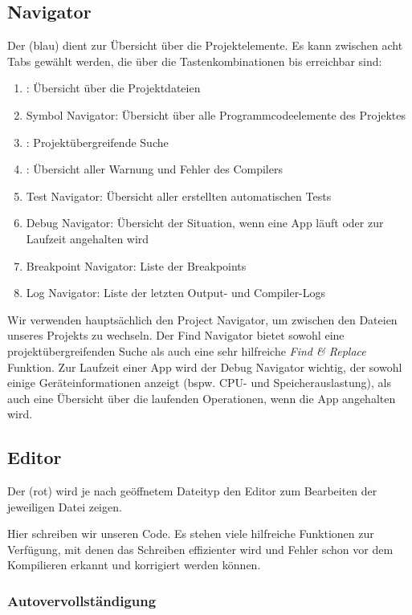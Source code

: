 \documentclass[parskip=half, final]{scrreprt}
\begin{document}
\subsection{Navigator}\label{sec:navigator}

Der  (blau) dient zur Übersicht über die Projektelemente. Es kann zwischen acht Tabs gewählt werden, die über die Tastenkombinationen   bis  erreichbar sind:
\begin{enumerate}
\item {}: Übersicht über die Projektdateien
\item Symbol Navigator: Übersicht über alle Programmcodeelemente des Projektes
\item {}: Projektübergreifende Suche
\item {}: Übersicht aller Warnung und Fehler des Compilers
\item Test Navigator: Übersicht aller erstellten automatischen Tests
\item Debug Navigator: Übersicht der Situation, wenn eine App läuft oder zur Laufzeit angehalten wird
\item Breakpoint Navigator: Liste der Breakpoints
\item Log Navigator: Liste der letzten Output- und Compiler-Logs
\end{enumerate}
Wir verwenden hauptsächlich den Project Navigator, um zwischen den Dateien unseres Projekts zu wechseln. Der Find Navigator bietet sowohl eine projektübergreifenden Suche als auch eine sehr hilfreiche \emph{Find \& Replace} Funktion. Zur Laufzeit einer App wird der Debug Navigator wichtig, der sowohl einige Geräteinformationen anzeigt (bspw. CPU- und Speicherauslastung), als auch eine Übersicht über die laufenden Operationen, wenn die App angehalten wird.

\subsection{Editor}

Der  (rot) wird je nach geöffnetem Dateityp den Editor zum Bearbeiten der jeweiligen Datei zeigen.

Hier schreiben wir unseren Code. Es stehen viele hilfreiche Funktionen zur Verfügung, mit denen das Schreiben effizienter wird und Fehler schon vor dem Kompilieren erkannt und korrigiert werden können.

\subsubsection{Autovervollständigung}
\end{document}
